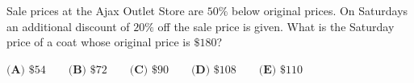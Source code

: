 Sale prices at the Ajax Outlet Store are $50\%$ below original prices. On Saturdays an additional discount of $20\%$ off the sale price is given. What is the Saturday price of a coat whose original price is $\$180$?

$\textbf{(A) }\$54\qquad\textbf{(B) }\$72\qquad\textbf{(C) }\$90\qquad\textbf{(D) }\$108\qquad\textbf{(E) }\$110$
